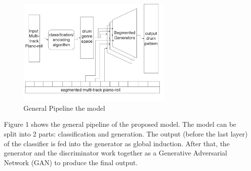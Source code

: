 \begin{par}
    \begin{figure}[H]
        \centering
        \includegraphics[width=3in]{image/proposal_architecture}
        \caption{General Pipeline the model}
        \label{fig:archie}
    \end{figure}
\end{par}

\begin{par}
    \par \hspace{15pt} Figure 1 shows the general pipeline of the proposed model. The model can be split into 2 parts: classification and generation. The output (before the last layer) of the classifier is fed into the generator as global induction. After that, the generator and the discriminator work together as a Generative Adversarial Network (GAN) to produce the final output.
\end{par}
